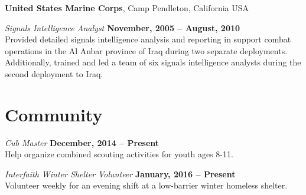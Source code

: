 \documentclass[margin,line]{res}
\begin{document}
\begin{resume}
{\bf United States Marine Corps}, Camp Pendleton, California USA

\vspace{-.3cm}
{\em Signals Intelligence Analyst} \hfill {\bf November, 2005 -- August, 2010}\\
Provided detailed signals intelligence analysis and reporting in
support combat operations in the Al Anbar province of Iraq during two
separate deployments. Additionally, trained and led a team of six
signals intelligence analysts during the second deployment to Iraq.

\section{\sc Community}

{\em Cub Master} \hfill {\bf December, 2014 -- Present}\\
Help organize combined scouting activities for youth ages 8-11.

\vspace{-.3cm}
{\em Interfaith Winter Shelter Volunteer} \hfill {\bf January, 2016 -- Present}\\
Volunteer weekly for an evening shift at a low-barrier winter homeless
shelter.


\end{resume}
\end{document}

